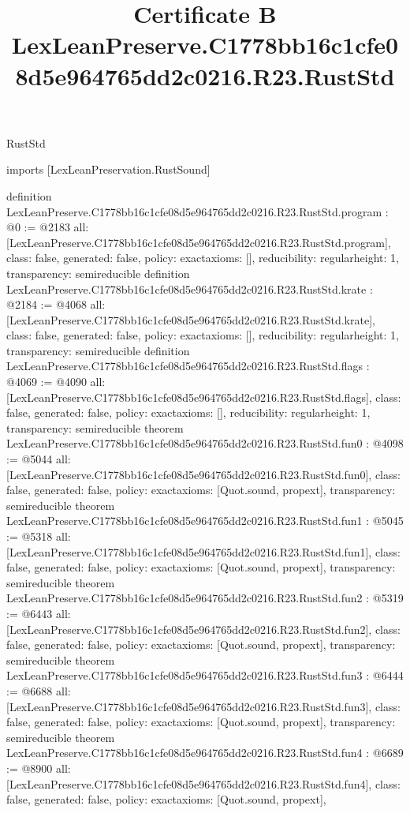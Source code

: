 \begin{lexlean}{RustStd}
\title{Certificate B LexLeanPreserve.C1778bb16c1cfe08d5e964765dd2c0216.R23.RustStd}
\begin{coremodule}
imports [LexLeanPreservation.RustSound]

definition LexLeanPreserve.C1778bb16c1cfe08d5e964765dd2c0216.R23.RustStd.program : @0 := @2183 {
  all: [LexLeanPreserve.C1778bb16c1cfe08d5e964765dd2c0216.R23.RustStd.program],
  class: false,
  generated: false,
  policy: exact{axioms: []},
  reducibility: regular{height: 1},
  transparency: semireducible
}
definition LexLeanPreserve.C1778bb16c1cfe08d5e964765dd2c0216.R23.RustStd.krate : @2184 := @4068 {
  all: [LexLeanPreserve.C1778bb16c1cfe08d5e964765dd2c0216.R23.RustStd.krate],
  class: false,
  generated: false,
  policy: exact{axioms: []},
  reducibility: regular{height: 1},
  transparency: semireducible
}
definition LexLeanPreserve.C1778bb16c1cfe08d5e964765dd2c0216.R23.RustStd.flags : @4069 := @4090 {
  all: [LexLeanPreserve.C1778bb16c1cfe08d5e964765dd2c0216.R23.RustStd.flags],
  class: false,
  generated: false,
  policy: exact{axioms: []},
  reducibility: regular{height: 1},
  transparency: semireducible
}
theorem LexLeanPreserve.C1778bb16c1cfe08d5e964765dd2c0216.R23.RustStd.fun0 : @4098 := @5044 {
  all: [LexLeanPreserve.C1778bb16c1cfe08d5e964765dd2c0216.R23.RustStd.fun0],
  class: false,
  generated: false,
  policy: exact{axioms: [Quot.sound, propext]},
  transparency: semireducible
}
theorem LexLeanPreserve.C1778bb16c1cfe08d5e964765dd2c0216.R23.RustStd.fun1 : @5045 := @5318 {
  all: [LexLeanPreserve.C1778bb16c1cfe08d5e964765dd2c0216.R23.RustStd.fun1],
  class: false,
  generated: false,
  policy: exact{axioms: [Quot.sound, propext]},
  transparency: semireducible
}
theorem LexLeanPreserve.C1778bb16c1cfe08d5e964765dd2c0216.R23.RustStd.fun2 : @5319 := @6443 {
  all: [LexLeanPreserve.C1778bb16c1cfe08d5e964765dd2c0216.R23.RustStd.fun2],
  class: false,
  generated: false,
  policy: exact{axioms: [Quot.sound, propext]},
  transparency: semireducible
}
theorem LexLeanPreserve.C1778bb16c1cfe08d5e964765dd2c0216.R23.RustStd.fun3 : @6444 := @6688 {
  all: [LexLeanPreserve.C1778bb16c1cfe08d5e964765dd2c0216.R23.RustStd.fun3],
  class: false,
  generated: false,
  policy: exact{axioms: [Quot.sound, propext]},
  transparency: semireducible
}
theorem LexLeanPreserve.C1778bb16c1cfe08d5e964765dd2c0216.R23.RustStd.fun4 : @6689 := @8900 {
  all: [LexLeanPreserve.C1778bb16c1cfe08d5e964765dd2c0216.R23.RustStd.fun4],
  class: false,
  generated: false,
  policy: exact{axioms: [Quot.sound, propext]},
}
\end{coremodule}
\end{lexlean}
